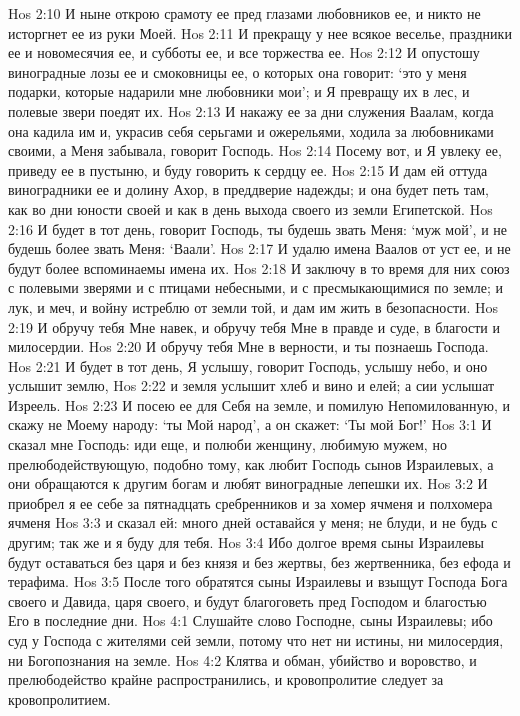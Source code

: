 Hos 2:10  И ныне открою срамоту ее пред глазами любовников ее, и никто не исторгнет ее из руки Моей.
Hos 2:11  И прекращу у нее всякое веселье, праздники ее и новомесячия ее, и субботы ее, и все торжества ее.
Hos 2:12  И опустошу виноградные лозы ее и смоковницы ее, о которых она говорит: `это у меня подарки, которые надарили мне любовники мои'; и Я превращу их в лес, и полевые звери поедят их.
Hos 2:13  И накажу ее за дни служения Ваалам, когда она кадила им и, украсив себя серьгами и ожерельями, ходила за любовниками своими, а Меня забывала, говорит Господь.
Hos 2:14  Посему вот, и Я увлеку ее, приведу ее в пустыню, и буду говорить к сердцу ее.
Hos 2:15  И дам ей оттуда виноградники ее и долину Ахор, в преддверие надежды; и она будет петь там, как во дни юности своей и как в день выхода своего из земли Египетской.
Hos 2:16  И будет в тот день, говорит Господь, ты будешь звать Меня: `муж мой', и не будешь более звать Меня: `Ваали'.
Hos 2:17  И удалю имена Ваалов от уст ее, и не будут более вспоминаемы имена их.
Hos 2:18  И заключу в то время для них союз с полевыми зверями и с птицами небесными, и с пресмыкающимися по земле; и лук, и меч, и войну истреблю от земли той, и дам им жить в безопасности.
Hos 2:19  И обручу тебя Мне навек, и обручу тебя Мне в правде и суде, в благости и милосердии.
Hos 2:20  И обручу тебя Мне в верности, и ты познаешь Господа.
Hos 2:21  И будет в тот день, Я услышу, говорит Господь, услышу небо, и оно услышит землю,
Hos 2:22  и земля услышит хлеб и вино и елей; а сии услышат Изреель.
Hos 2:23  И посею ее для Себя на земле, и помилую Непомилованную, и скажу не Моему народу: `ты Мой народ', а он скажет: `Ты мой Бог!'
Hos 3:1  И сказал мне Господь: иди еще, и полюби женщину, любимую мужем, но прелюбодействующую, подобно тому, как любит Господь сынов Израилевых, а они обращаются к другим богам и любят виноградные лепешки их.
Hos 3:2  И приобрел я ее себе за пятнадцать сребренников и за хомер ячменя и полхомера ячменя
Hos 3:3  и сказал ей: много дней оставайся у меня; не блуди, и не будь с другим; так же и я буду для тебя.
Hos 3:4  Ибо долгое время сыны Израилевы будут оставаться без царя и без князя и без жертвы, без жертвенника, без ефода и терафима.
Hos 3:5  После того обратятся сыны Израилевы и взыщут Господа Бога своего и Давида, царя своего, и будут благоговеть пред Господом и благостью Его в последние дни.
Hos 4:1  Слушайте слово Господне, сыны Израилевы; ибо суд у Господа с жителями сей земли, потому что нет ни истины, ни милосердия, ни Богопознания на земле.
Hos 4:2  Клятва и обман, убийство и воровство, и прелюбодейство крайне распространились, и кровопролитие следует за кровопролитием.
